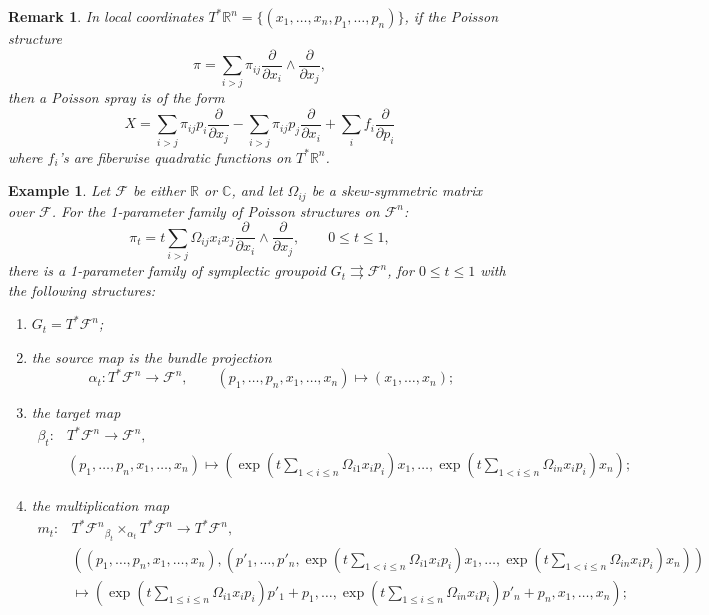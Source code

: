 \documentclass{amsart}
\newtheorem{remark}[theorem]{Remark}
\newtheorem{example}[theorem]{Example}
\newcommand{\cF}{\mathcal{F}}
\newcommand{\CC}{\mathbb{C}}
\newcommand{\RR}{\mathbb{R}}
\newcommand{\rra}{\rightrightarrows}
\begin{document}
\begin{remark} \label{remark:PoiSpLoc}
In local coordinates $T^*\mathbb{R}^n = \{(x_1, \ldots, x_n, p_1, \ldots, p_n)\}$, if the Poisson structure
$$
	\pi = \sum_{i > j} \pi_{ij} \frac{\partial}{\partial x_i} \wedge \frac{\partial}{\partial x_j},
$$
then a Poisson spray is of the form
$$
	X = \sum_{i > j} \pi_{ij} p_i \frac{\partial}{\partial x_j} - \sum_{i > j} \pi_{ij} p_j \frac{\partial}{\partial x_i} + \sum_i f_i \frac{\partial}{\partial p_i}
$$
where $f_i$'s are fiberwise quadratic functions on $T^*\mathbb{R}^n$.
\end{remark}

\begin{example} \label{ex:PoiSpLogC}
Let $\cF$ be either $\RR$ or $\CC$, and let $\Omega_{ij}$ be a skew-symmetric matrix over $\cF$. For the 1-parameter family of Poisson structures on $\cF^n$:
$$
	\pi_t = t\sum_{i > j} \Omega_{ij} x_i x_j\frac{\partial}{\partial x_i} \wedge \frac{\partial}{\partial x_j}, \qquad 0\leq t \leq 1,
$$
there is a 1-parameter family of symplectic groupoid $G_t \rra \cF^n$, for $0 \leq t \leq 1$ with the following structures:
	\begin{enumerate}
		\item $G_t = T^*\cF^n$;
		\item the source map is the bundle projection
			$$
				\alpha_t: T^*\cF^n \to \cF^n, \qquad (p_1, \ldots, p_n, x_1, \ldots, x_n) \mapsto (x_1, \ldots, x_n);
			$$
		\item the target map
			$$
				\begin{aligned}
				\beta_t: & T^*\cF^n \to \cF^n, \\
				& (p_1, \ldots, p_n, x_1, \ldots, x_n) \mapsto \left(\exp\left(t\sum\limits_{1 < i \leq n} \Omega_{i1} x_ip_i \right)x_1, \ldots, \exp\left(t\sum\limits_{1 < i \leq n} \Omega_{in} x_ip_i \right)x_n\right);
				\end{aligned}
			$$
		\item the multiplication map
			$$
				\begin{aligned}
				m_t: & T^*\cF^n {_{\beta_t}\times_{\alpha_t}} T^*\cF^n \to T^*\cF^n, \\
				& \left(\left(p_1, \ldots, p_n, x_1, \ldots, x_n\right), \left(p'_1, \ldots, p'_n, \exp\left(t\sum\limits_{1 < i \leq n} \Omega_{i1} x_ip_i \right)x_1, \ldots, \exp\left(t\sum\limits_{1 < i \leq n} \Omega_{in} x_ip_i \right)x_n\right)\right) \\
				& \mapsto \left(\exp\left(t \sum\limits_{1\leq i\leq n}\Omega_{i1}x_i p_i\right) p'_1 + p_1, \ldots, \exp\left(t \sum\limits_{1\leq i\leq n}\Omega_{in}x_i p_i\right) p'_n + p_n, x_1, \ldots, x_n \right);

\end{aligned}$$
\end{enumerate}
\end{example}
\end{document}

